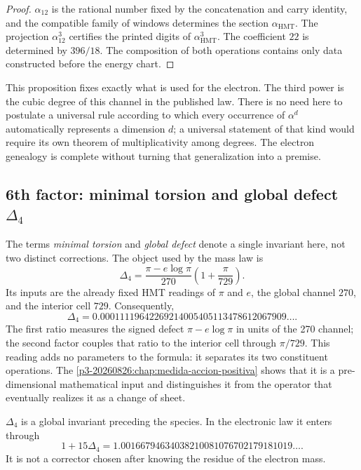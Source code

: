 \begin{proof}
\(\alpha_{12}\) is the rational number fixed by the concatenation and carry
identity, and the compatible family of windows determines the section
\(\alpha_{\mathrm{HMT}}\). The projection \(\alpha_{12}^3\) certifies the
printed digits of \(\alpha_{\mathrm{HMT}}^3\).
The coefficient \(22\) is determined by \(396/18\). The composition of
both operations contains only data constructed before the
energy chart.
\end{proof}

This proposition fixes exactly what is used for the electron. The third power is the cubic degree of this channel in the published law. There is no need here to postulate a universal rule according to which every occurrence of \(\alpha^d\) automatically represents a dimension \(d\); a universal statement of that kind would require its own theorem of multiplicativity among degrees. The electron genealogy is complete without turning that generalization into a premise.

\subsection{6th factor: minimal torsion and global defect \(\Delta_4\)}

The terms \emph{minimal torsion} and \emph{global defect}
denote a single invariant here, not two distinct corrections. The object
used by the mass law is
\begin{equation}
 \label{eq:delta4-electron-rev6}
 \boxed{
 \Delta_4
 =
 \frac{\pi-e\log\pi}{270}
 \left(1+\frac{\pi}{729}\right).}
\end{equation}
Its inputs are the already fixed HMT readings of \(\pi\) and \(e\), the global
channel \(270\), and the interior cell \(729\). Consequently,
\[
 \Delta_4
 =
 0.00011119642269214005405113478612067909\ldots.
\]
The first ratio measures the signed defect \(\pi-e\log\pi\) in units of the 270 channel; the second factor couples that ratio to the interior cell through \(\pi/729\). This reading adds no parameters to the formula: it separates its two constituent operations. The \cref{p3-20260826:chap:medida-accion-positiva} shows that it is a pre-dimensional mathematical input and distinguishes it from the operator that eventually realizes it as a change of sheet.

\begin{proposition}
\label{prop:delta4-global-electron-rev6}
\(\Delta_4\) is a global invariant preceding the species. In the electronic
law it enters through
\[
 1+15\Delta_4
 =
 1.00166794634038210081076702179181019\ldots.
\]
It is not a corrector chosen after knowing the residue of the electron mass.
\end{proposition}

